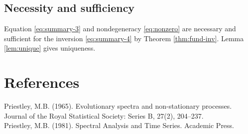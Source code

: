 \documentclass[12pt]{article}
\theoremstyle{plain}
\begin{document}
\subsection*{Necessity and sufficiency}
Equation \eqref{eq:summary-3} and nondegeneracy \eqref{eq:nonzero} are necessary and sufficient for the inversion \eqref{eq:summary-4} by Theorem \ref{thm:fund-inv}. Lemma \ref{lem:unique} gives uniqueness.

\section{References}
\noindent Priestley, M.B. (1965). Evolutionary spectra and non-stationary processes. Journal of the Royal Statistical Society: Series B, 27(2), 204--237.\\
Priestley, M.B. (1981). Spectral Analysis and Time Series. Academic Press.
\end{document}
